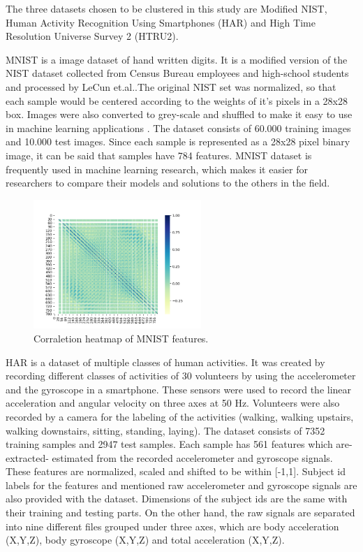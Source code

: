 \documentclass[journal]{IEEEtran}
\begin{document}
The three datasets chosen to be clustered in this study are Modified NIST, Human Activity Recognition Using Smartphones (HAR) 
and High Time Resolution Universe Survey 2 (HTRU2).\par

MNIST is a image dataset of hand written digits. It is a modified version of the NIST dataset collected from Census Bureau employees and high-school
students and processed by LeCun et.al..The original NIST set was normalized, so that each sample would be centered
according to the weights of it's pixels in a 28x28 box. Images were also converted to grey-scale and shuffled to make it
easy to use in machine learning applications \cite{lecun1998gradient}. The dataset consists of 60.000 training images and 10.000 test images. Since each
sample is represented as a 28x28 pixel binary image, it can be said that samples have 784 features. MNIST dataset is frequently
used in machine learning research, which makes it easier for researchers to compare their models and solutions to the others
in the field.

\begin{figure}[!ht]
\centering
\includegraphics[width=2.5in]{images/cor_heat_mnist.png}
\caption{Corraletion heatmap of MNIST features.}
\label{fig_mnist}
\end{figure}

HAR is a dataset of multiple classes of human activities. It was created by recording different classes of activities of 30 volunteers
by using the accelerometer and the gyroscope in a smartphone. These sensors were used to record the linear acceleration and angular velocity
on three axes at 50 Hz. Volunteers were also recorded by a camera for the labeling of the activities (walking, walking upstairs, walking downstairs, sitting, standing, laying)\cite{anguita2013public}. The dataset consists of 7352
training samples and 2947 test samples. Each sample has 561 features which are- extracted- estimated from the recorded accelerometer and gyroscope signals. These features are normalized, scaled and shifted to be within [-1,1].  Subject id labels for the features and mentioned raw accelerometer and gyroscope signals are also provided with the dataset.
Dimensions of the subject ids are the same with their training and testing parts. On the other hand, the raw signals are separated into nine different files grouped under three axes, which are body acceleration (X,Y,Z), body gyroscope (X,Y,Z) and total acceleration (X,Y,Z).
\end{document}
